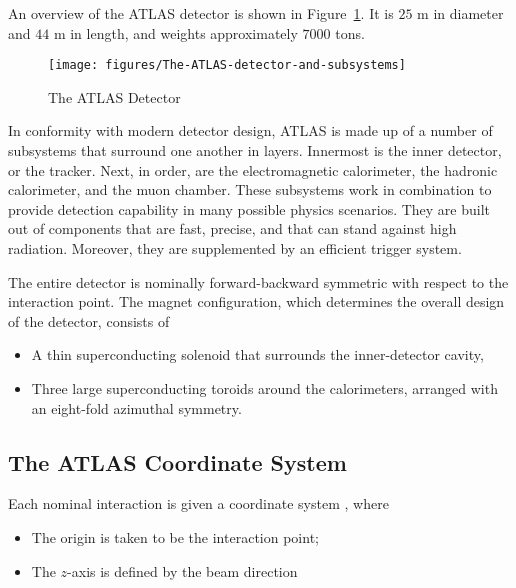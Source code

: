 An overview of the ATLAS detector is shown in Figure~\ref{f:atlasd}. It is $25$
m in diameter and $44$ m in length, and weights approximately $7000$ tons.

\begin{figure}[H]
	\texttt{[image: figures/The-ATLAS-detector-and-subsystems]}
	\centering
	\caption{The ATLAS Detector}\cite{atlasdetector}
	\label{f:atlasd}
\end{figure}


In conformity with modern detector design, ATLAS is made up of a number of
subsystems that surround one another in layers. Innermost is the inner
detector, or the tracker. Next, in order, are the electromagnetic calorimeter,
the hadronic calorimeter, and the muon chamber. These subsystems work in
combination to provide detection capability in many possible physics scenarios.
They are built out of components that are fast, precise, and that can stand
against high radiation. Moreover, they are supplemented by an efficient trigger
system.

The entire detector is nominally forward-backward symmetric with respect to the
interaction point. The magnet configuration, which determines the overall
design of the detector, consists of

\begin{itemize}
	\item A thin superconducting solenoid that surrounds the inner-detector cavity,

	\item Three large superconducting toroids around the calorimeters, arranged
	      with an eight-fold azimuthal symmetry.


\end{itemize}





\subsection{The ATLAS Coordinate System}

Each nominal interaction is given a coordinate system \cite{lhcaccexp}, where

\begin{itemize}
	\item The origin is taken to be the interaction point;
	\item The $z$-axis is defined by the beam direction
\end{itemize}


